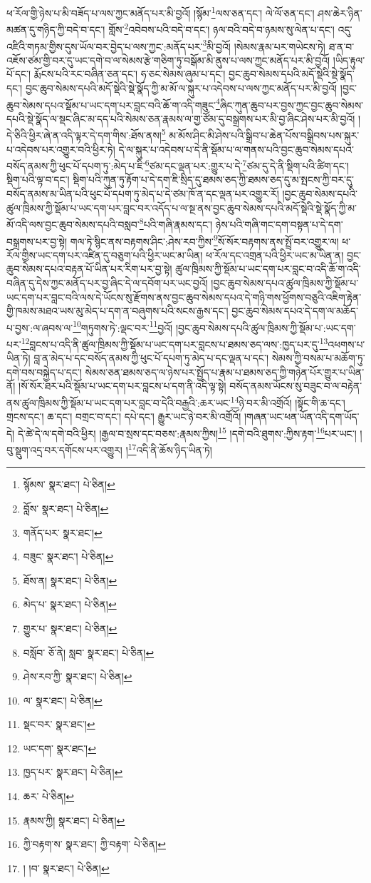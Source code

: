 ཕ་རོལ་གྱི་ཉེས་པ་མི་བཟོད་པ་ལས་ཀྱང་མནོད་པར་མི་བྱའོ། །སྙོམ་\footnote{སྙོམས་  སྣར་ཐང་།  པེ་ཅིན། }ལས་ཅན་དང་། ལེ་ལོ་ཅན་དང་། ཤས་ཆེར་ཉིན་མཚན་དུ་གཉིད་ཀྱི་བདེ་བ་དང་། གློས་\footnote{བློས་  སྣར་ཐང་།  པེ་ཅིན། }འབེབས་པའི་བདེ་བ་དང་། ཉལ་བའི་བདེ་བ་ཉམས་སུ་ལེན་པ་དང་། འདུ་འཛིའི་གཏམ་གྱིས་དུས་ཡོལ་བར་བྱེད་པ་ལས་ཀྱང་:མནོད་པར་\footnote{གནོད་པར་  སྣར་ཐང་། }མི་བྱའོ། །སེམས་རྣམ་པར་གཡེངས་ཏེ། ཐ་ན་བ་འཇོས་ཙམ་གྱི་བར་དུ་ཡང་དགེ་བ་ལ་སེམས་རྩེ་གཅིག་ཏུ་བསྒོམ་མི་ནུས་པ་ལས་ཀྱང་མནོད་པར་མི་བྱའོ། །ཡིད་རྟུལ་པོ་དང་། རྨོངས་པའི་རང་བཞིན་ཅན་དང་། ཧ་ཅང་སེམས་ཞུམ་པ་དང་། བྱང་ཆུབ་སེམས་དཔའི་མདོ་སྡེའི་སྡེ་སྣོད་དང་། བྱང་ཆུབ་སེམས་དཔའི་མདོ་སྡེའི་སྡེ་སྣོད་ཀྱི་མ་མོ་ལ་སྐུར་པ་འདེབས་པ་ལས་ཀྱང་མནོད་པར་མི་བྱའོ། །བྱང་ཆུབ་སེམས་དཔའ་སྡོམ་པ་ཡང་དག་པར་བླང་བའི་ཆོ་ག་འདི་གཟུང་\footnote{བཟུང་  སྣར་ཐང་།  པེ་ཅིན། }ཞིང་ཀུན་ཆུབ་པར་བྱས་ཀྱང་བྱང་ཆུབ་སེམས་དཔའི་སྡེ་སྣོད་ལ་སྡང་ཞིང་མ་དད་པའི་སེམས་ཅན་རྣམས་ལ་གྱ་ཙོམ་དུ་བསྒྲགས་པར་མི་བྱ་ཞིང་ཤེས་པར་མི་བྱའོ། །དེ་ཅིའི་ཕྱིར་ཞེ་ན་འདི་ལྟར་དེ་དག་གིས་:ཐོས་ནས།\footnote{ཐོས་ན།  སྣར་ཐང་།  པེ་ཅིན། } མ་མོས་ཤིང་མི་ཤེས་པའི་སྒྲིབ་པ་ཆེན་པོས་བསྒྲིབས་པས་སྐུར་པ་འདེབས་པར་འགྱུར་བའི་ཕྱིར་ཏེ། དེ་ལ་སྐུར་པ་འདེབས་པ་དེ་ནི་སྡོམ་པ་ལ་གནས་པའི་བྱང་ཆུབ་སེམས་དཔའ་བསོད་ནམས་ཀྱི་ཕུང་པོ་དཔག་ཏུ་:མེད་པ་ཇི་\footnote{མེད་པ་  སྣར་ཐང་།  པེ་ཅིན། }ཙམ་དང་ལྡན་པར་:གྱུར་པ་དེ་\footnote{གྱུར་པ་  སྣར་ཐང་།  པེ་ཅིན། }ཙམ་དུ་དེ་ནི་སྡིག་པའི་ཚིག་དང་། སྡིག་པའི་ལྟ་བ་དང་། སྡིག་པའི་ཀུན་ཏུ་རྟོག་པ་དེ་དག་ཇི་སྲིད་དུ་ཐམས་ཅད་ཀྱི་ཐམས་ཅད་དུ་མ་སྤངས་ཀྱི་བར་དུ་བསོད་ནམས་མ་ཡིན་པའི་ཕུང་པོ་དཔག་ཏུ་མེད་པ་དེ་ཙམ་ཁོ་ན་དང་ལྡན་པར་འགྱུར་རོ། །བྱང་ཆུབ་སེམས་དཔའི་ཚུལ་ཁྲིམས་ཀྱི་སྡོམ་པ་ཡང་དག་པར་བླང་བར་འདོད་པ་ལ་སྔ་ནས་བྱང་ཆུབ་སེམས་དཔའི་མདོ་སྡེའི་སྡེ་སྣོད་ཀྱི་མ་མོ་འདི་ལས་བྱང་ཆུབ་སེམས་དཔའི་བསླབ་\footnote{བསློབ་  ཅོ་ནེ། སླབ་  སྣར་ཐང་།  པེ་ཅིན། }པའི་གཞི་རྣམས་དང་། ཉེས་པའི་གཞི་གང་དག་བསྟན་པ་དེ་དག་བསྒྲགས་པར་བྱ་སྟེ། གལ་ཏེ་སྙིང་ནས་བརྟགས་ཤིང་:ཤེས་རབ་ཀྱིས་\footnote{ཤེས་རབ་ཀྱི་  སྣར་ཐང་།  པེ་ཅིན། }སོ་སོར་བརྟགས་ནས་སྤྲོ་བར་འགྱུར་ལ། ཕ་རོལ་གྱིས་ཡང་དག་པར་འཛིན་དུ་བཅུག་པའི་ཕྱིར་ཡང་མ་ཡིན། ཕ་རོལ་དང་འགྲན་པའི་ཕྱིར་ཡང་མ་ཡིན་ན། བྱང་ཆུབ་སེམས་དཔའ་བརྟན་པོ་ཡིན་པར་རིག་པར་བྱ་སྟེ། ཚུལ་ཁྲིམས་ཀྱི་སྡོམ་པ་ཡང་དག་པར་བླང་བ་འདི་ཆོ་ག་འདི་བཞིན་དུ་དེས་ཀྱང་མནོད་པར་བྱ་ཞིང་དེ་ལ་དབོག་པར་ཡང་བྱའོ། །བྱང་ཆུབ་སེམས་དཔའ་ཚུལ་ཁྲིམས་ཀྱི་སྡོམ་པ་ཡང་དག་པར་བླང་བའི་ལས་དེ་ཡོངས་སུ་རྫོགས་ནས་བྱང་ཆུབ་སེམས་དཔའ་དེ་གཉི་གས་ཕྱོགས་བཅུའི་འཇིག་རྟེན་གྱི་ཁམས་མཐའ་ཡས་མུ་མེད་པ་དག་ན་བཞུགས་པའི་སངས་རྒྱས་དང་། བྱང་ཆུབ་སེམས་དཔའ་དེ་དག་ལ་མཆོད་པ་བྱས་:ལ་ཞབས་ལ་\footnote{ལ་  སྣར་ཐང་།  པེ་ཅིན། }གཏུགས་ཏེ་:ལྡང་བར་\footnote{སྡང་བར་  སྣར་ཐང་། }བྱའོ། །བྱང་ཆུབ་སེམས་དཔའི་ཚུལ་ཁྲིམས་ཀྱི་སྡོམ་པ་:ཡང་དག་པར་\footnote{ཡང་དག་  སྣར་ཐང་། }བླངས་པ་འདི་ནི་ཚུལ་ཁྲིམས་ཀྱི་སྡོམ་པ་ཡང་དག་པར་བླངས་པ་ཐམས་ཅད་ལས་:ཁྱད་པར་དུ་\footnote{ཁྱད་པར་  སྣར་ཐང་།  པེ་ཅིན། }འཕགས་པ་ཡིན་ཏེ། བླ་ན་མེད་པ་དང་བསོད་ནམས་ཀྱི་ཕུང་པོ་དཔག་ཏུ་མེད་པ་དང་ལྡན་པ་དང་། སེམས་ཀྱི་བསམ་པ་མཆོག་ཏུ་དགེ་བས་བསྐྱེད་པ་དང་། སེམས་ཅན་ཐམས་ཅད་ལ་ཉེས་པར་སྤྱོད་པ་རྣམ་པ་ཐམས་ཅད་ཀྱི་གཉེན་པོར་གྱུར་པ་ཡིན་ནོ། །སོ་སོར་ཐར་པའི་སྡོམ་པ་ཡང་དག་པར་བླངས་པ་དག་ནི་འདི་ལྟ་སྟེ། བསོད་ནམས་ཡོངས་སུ་བཟུང་བ་ལ་བརྟེན་ནས་ཚུལ་ཁྲིམས་ཀྱི་སྡོམ་པ་ཡང་དག་པར་བླང་བ་དེའི་བརྒྱའི་:ཆར་ཡང་\footnote{ཆར་  པེ་ཅིན། }ཉེ་བར་མི་འགྲོའོ། །སྟོང་གི་ཆ་དང་། གྲངས་དང་། ཆ་དང་། བགྲང་བ་དང་། དཔེ་དང་། རྒྱུར་ཡང་ཉེ་བར་མི་འགྲོའོ། །གཞན་ཡང་ཕན་ཡོན་འདི་དག་ཡོད་དེ། དེ་ཚེ་དེ་ལ་དགེ་བའི་ཕྱིར། །རྒྱལ་བ་སྲས་དང་བཅས་:རྣམས་ཀྱིས།\footnote{རྣམས་ཀྱི།  སྣར་ཐང་།  པེ་ཅིན། } །དགེ་བའི་ཐུགས་:ཀྱིས་རྟག་\footnote{ཀྱི་བརྟག་ས་  སྣར་ཐང་། ཀྱི་བརྟག་  པེ་ཅིན། }པར་ཡང་། །བུ་སྡུག་འདྲ་བར་དགོངས་པར་འགྱུར། །\footnote{། །བ་  སྣར་ཐང་།  པེ་ཅིན། }འདི་ནི་ཆོས་ཉིད་ཡིན་ཏེ། 